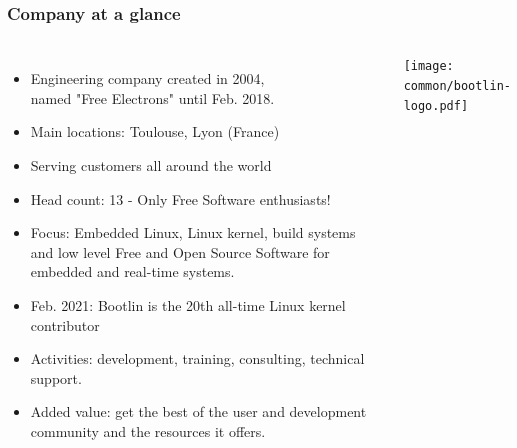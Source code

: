 \begin{frame}
\frametitle{Company at a glance}
  \begin{columns}
  \small
  \begin{itemize}
    \item Engineering company created in 2004,\\
	  named "Free Electrons" until Feb. 2018.
    \item Main locations: Toulouse, Lyon (France)
    \item Serving customers all around the world
    \item Head count: 13 - Only Free Software enthusiasts!
    \item Focus: Embedded Linux, Linux kernel,
          build systems and low level Free and Open Source Software
          for embedded and real-time systems.
    \item Feb. 2021: Bootlin is the 20th all-time Linux kernel contributor
    \item Activities: development, training, consulting, technical
          support.
    \item Added value: get the best of the user and development
          community and the resources it offers.
  \end{itemize}
  \texttt{[image: common/bootlin-logo.pdf]}\\
  \vspace{0.25cm}

\end{columns}
\end{frame}
